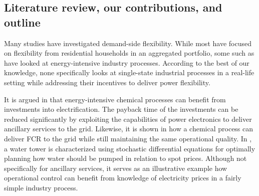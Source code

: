 \documentclass[conference]{IEEEtran}
\begin{document}
\vspace{1mm}
\subsection{Literature review, our contributions, and outline}
\vspace{-1mm}
Many studies have investigated demand-side flexibility. While most have focused on flexibility from residential households in an aggregated portfolio, some such as \cite{paulus2011potential} have looked at energy-intensive industry processes. 
According to the best of our knowledge, none specifically looks at single-state industrial processes in a real-life setting while addressing their incentives to deliver power flexibility.


%
It is argued in \cite{mallapragada2023decarbonization} that energy-intensive chemical processes can benefit from investments into electrification. The payback time of the investments can be reduced significantly by exploiting the capabilities of power electronics to deliver ancillary services to the grid. Likewise, it is shown in \cite{samani2022flexible} how a chemical process can deliver FCR to the grid while still maintaining the same operational quality.
%
In \cite{junker2020stochastic}, a water tower is characterized using stochastic differential equations for optimally planning how water should be pumped in relation to spot prices. Although not specifically for ancillary services, it serves as an illustrative example how operational control can benefit from knowledge of electricity prices in a fairly simple industry process.
\end{document}
